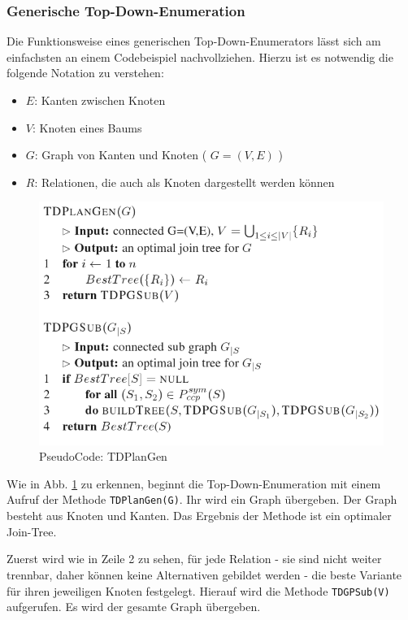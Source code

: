 \subsubsection{Generische Top-Down-Enumeration}

Die Funktionsweise eines generischen Top-Down-Enumerators lässt sich am einfachsten an einem Codebeispiel nachvollziehen. Hierzu ist es notwendig die folgende Notation  zu verstehen:

\begin{itemize}
\item $E$: Kanten zwischen Knoten
\item $V$: Knoten eines Baums
\item $G$: Graph von Kanten und Knoten ( $G = (V,E)$ )
\item $R$: Relationen, die auch als Knoten dargestellt werden können
\end{itemize}


\begin{figure}[ht]
  \centering
  \includegraphics[scale=0.4]{03_Regeln/00_media/TDPlanGen.png}
  \caption{PseudoCode: TDPlanGen}
  \label{TDPlanGen}
\end{figure}


Wie in Abb. \ref{TDPlanGen} zu erkennen, beginnt die Top-Down-Enumeration mit einem Aufruf der Methode \texttt{TDPlanGen(G)}. Ihr wird ein Graph übergeben. Der Graph besteht aus Knoten und Kanten. Das Ergebnis der Methode ist ein optimaler Join-Tree.

Zuerst wird wie in Zeile 2 zu sehen, für jede Relation - sie sind nicht weiter trennbar, daher können keine Alternativen gebildet werden - die beste Variante für ihren jeweiligen Knoten festgelegt. Hierauf wird die Methode \texttt{TDGPSub(V)} aufgerufen. Es wird der gesamte Graph übergeben.


